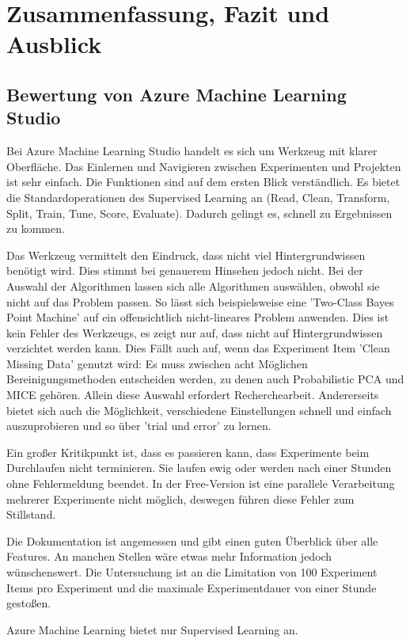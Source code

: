 \chapter{Zusammenfassung, Fazit und Ausblick}\label{chap:Bewertung}

\section{Bewertung von Azure Machine Learning Studio}\label{sec:BeswertungAzure}
Bei Azure Machine Learning Studio handelt es sich um Werkzeug mit klarer Oberfläche. Das Einlernen und Navigieren zwischen Experimenten und Projekten ist sehr einfach. Die Funktionen sind auf dem ersten Blick verständlich. Es bietet die Standardoperationen des Supervised Learning an (Read, Clean, Transform, Split, Train, Tune, Score, Evaluate). Dadurch gelingt es, schnell zu Ergebnissen zu kommen.\par
Das Werkzeug vermittelt den Eindruck, dass nicht viel Hintergrundwissen benötigt wird. Dies stimmt bei genauerem Hinsehen jedoch nicht. Bei der Auswahl der Algorithmen lassen sich alle Algorithmen auswählen, obwohl sie nicht auf das Problem passen. So lässt sich beispielsweise eine 'Two-Class Bayes Point Machine' auf ein offensichtlich nicht-lineares Problem anwenden. Dies ist kein Fehler des Werkzeugs, es zeigt nur auf, dass nicht auf Hintergrundwissen verzichtet werden kann. Dies Fällt auch auf, wenn  das Experiment Item 'Clean Missing Data' genutzt wird: Es muss zwischen acht Möglichen Bereinigungsmethoden entscheiden werden, zu denen auch Probabilistic PCA und MICE gehören. Allein diese Auswahl erfordert Recherchearbeit.
Andererseits bietet sich auch die Möglichkeit, verschiedene Einstellungen schnell und einfach auszuprobieren und so über 'trial und error' zu lernen.\par
Ein großer Kritikpunkt ist, dass es passieren kann, dass Experimente beim Durchlaufen nicht terminieren. Sie laufen ewig oder werden nach einer Stunden ohne Fehlermeldung beendet. In der Free-Version ist eine parallele Verarbeitung mehrerer Experimente nicht möglich, deswegen führen diese Fehler zum Stillstand.\par
Die Dokumentation ist angemessen und gibt einen guten Überblick über alle Features. An manchen Stellen wäre etwas mehr Information jedoch wünschenswert. Die Untersuchung ist an die Limitation von 100 Experiment Items pro Experiment und die maximale Experimentdauer von einer Stunde gestoßen.\par
Azure Machine Learning bietet nur Supervised Learning an.\par
